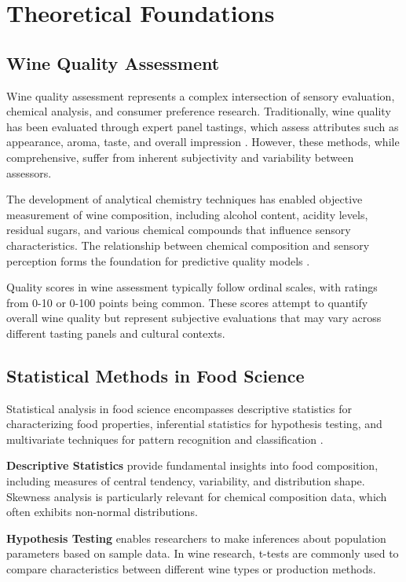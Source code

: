 \chapter{Theoretical Foundations}

\section{Wine Quality Assessment}

Wine quality assessment represents a complex intersection of sensory evaluation, chemical analysis, and consumer preference research. Traditionally, wine quality has been evaluated through expert panel tastings, which assess attributes such as appearance, aroma, taste, and overall impression \cite{jackson2020}. However, these methods, while comprehensive, suffer from inherent subjectivity and variability between assessors.

The development of analytical chemistry techniques has enabled objective measurement of wine composition, including alcohol content, acidity levels, residual sugars, and various chemical compounds that influence sensory characteristics. The relationship between chemical composition and sensory perception forms the foundation for predictive quality models \cite{waterhouse2016}.

Quality scores in wine assessment typically follow ordinal scales, with ratings from 0-10 or 0-100 points being common. These scores attempt to quantify overall wine quality but represent subjective evaluations that may vary across different tasting panels and cultural contexts.

\section{Statistical Methods in Food Science}

Statistical analysis in food science encompasses descriptive statistics for characterizing food properties, inferential statistics for hypothesis testing, and multivariate techniques for pattern recognition and classification \cite{granato2018}.

\textbf{Descriptive Statistics} provide fundamental insights into food composition, including measures of central tendency, variability, and distribution shape. Skewness analysis is particularly relevant for chemical composition data, which often exhibits non-normal distributions.

\textbf{Hypothesis Testing} enables researchers to make inferences about population parameters based on sample data. In wine research, t-tests are commonly used to compare characteristics between different wine types or production methods.

